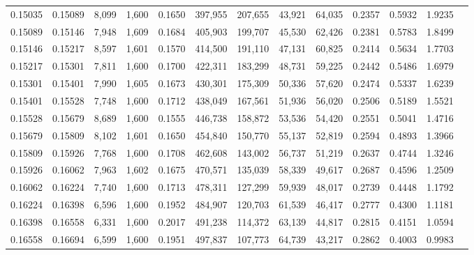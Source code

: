 \begin{tabular}{rrrrrrrrrrrrr}
0.15035 & 0.15089 &  8,099 & 1,600 &                                     0.1650 & 397,955 & 207,655 &  43,921 &  64,035 & 0.2357 & 0.5932 & 1.9235 \\
0.15089 & 0.15146 &  7,948 & 1,609 &                                     0.1684 & 405,903 & 199,707 &  45,530 &  62,426 & 0.2381 & 0.5783 & 1.8499 \\
0.15146 & 0.15217 &  8,597 & 1,601 &                                     0.1570 & 414,500 & 191,110 &  47,131 &  60,825 & 0.2414 & 0.5634 & 1.7703 \\
0.15217 & 0.15301 &  7,811 & 1,600 &                                     0.1700 & 422,311 & 183,299 &  48,731 &  59,225 & 0.2442 & 0.5486 & 1.6979 \\
0.15301 & 0.15401 &  7,990 & 1,605 &                                     0.1673 & 430,301 & 175,309 &  50,336 &  57,620 & 0.2474 & 0.5337 & 1.6239 \\
0.15401 & 0.15528 &  7,748 & 1,600 &                                     0.1712 & 438,049 & 167,561 &  51,936 &  56,020 & 0.2506 & 0.5189 & 1.5521 \\
0.15528 & 0.15679 &  8,689 & 1,600 &                                     0.1555 & 446,738 & 158,872 &  53,536 &  54,420 & 0.2551 & 0.5041 & 1.4716 \\
0.15679 & 0.15809 &  8,102 & 1,601 &                                     0.1650 & 454,840 & 150,770 &  55,137 &  52,819 & 0.2594 & 0.4893 & 1.3966 \\
0.15809 & 0.15926 &  7,768 & 1,600 &                                     0.1708 & 462,608 & 143,002 &  56,737 &  51,219 & 0.2637 & 0.4744 & 1.3246 \\
0.15926 & 0.16062 &  7,963 & 1,602 &                                     0.1675 & 470,571 & 135,039 &  58,339 &  49,617 & 0.2687 & 0.4596 & 1.2509 \\
0.16062 & 0.16224 &  7,740 & 1,600 &                                     0.1713 & 478,311 & 127,299 &  59,939 &  48,017 & 0.2739 & 0.4448 & 1.1792 \\
0.16224 & 0.16398 &  6,596 & 1,600 &                                     0.1952 & 484,907 & 120,703 &  61,539 &  46,417 & 0.2777 & 0.4300 & 1.1181 \\
0.16398 & 0.16558 &  6,331 & 1,600 &                                     0.2017 & 491,238 & 114,372 &  63,139 &  44,817 & 0.2815 & 0.4151 & 1.0594 \\
0.16558 & 0.16694 &  6,599 & 1,600 &                                     0.1951 & 497,837 & 107,773 &  64,739 &  43,217 & 0.2862 & 0.4003 & 0.9983 \\

\end{tabular}
